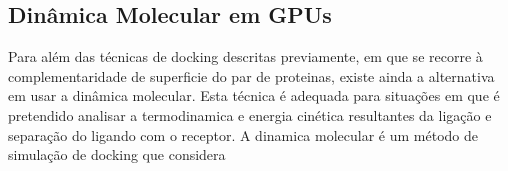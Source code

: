 \subsection{Dinâmica Molecular em GPUs}
Para além das técnicas de docking descritas previamente, em que se recorre à complementaridade de superficie do par de proteinas, existe ainda a alternativa em usar a dinâmica molecular. Esta técnica é adequada para situações em que é pretendido analisar a termodinamica e energia cinética resultantes da ligação e separação do ligando com o receptor\cite{sledz2018protein}.
A dinamica molecular é um método de simulação de docking que considera 
%
%
